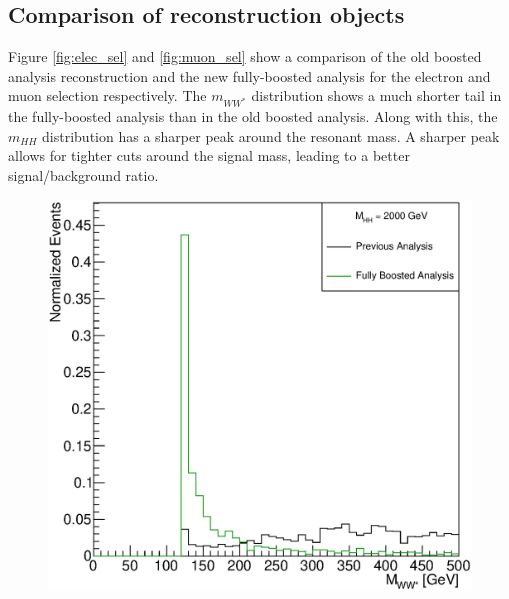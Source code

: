 \subsection{Comparison of reconstruction objects}
Figure \ref{fig:elec_sel} and \ref{fig:muon_sel} show a comparison of the old boosted analysis reconstruction and the new fully-boosted analysis for the electron and muon selection respectively. The $m_{WW^*{}}$ distribution shows a much shorter tail in the fully-boosted analysis than in the old boosted analysis. Along with this, the $m_{HH}$ distribution has a sharper peak around the resonant mass. A sharper peak allows for tighter cuts around the signal mass, leading to a better signal/background ratio.



\begin{figure}[h]
\begin{center}
\includegraphics[scale=0.25]{figures/WHad_plots_john_withcuts/electron/hww_m_Xhh2000}

\end{center}
\end{figure}
